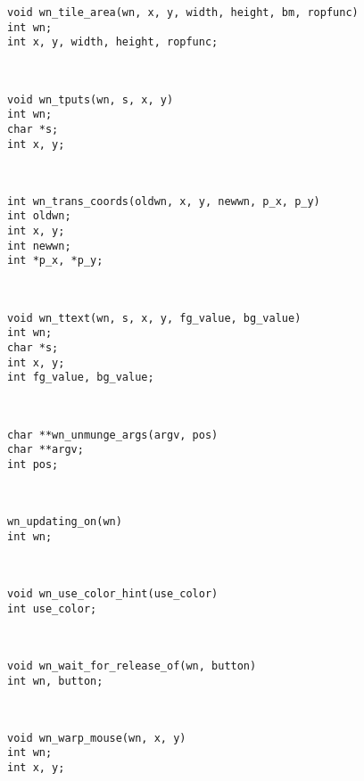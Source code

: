 \parbox[t]{5in}{\tt void wn\_tile\_area(wn, x, y, width, height, bm, ropfunc)\\int wn;\\int x, y, width, height, ropfunc;}\> \pageref{wn_tile_area}\\[0.1in]
\parbox[t]{5in}{\tt void wn\_tputs(wn, s, x, y)\\int wn;\\char *s;\\int x, y;}\> \pageref{wn_tputs}\\[0.1in]
\parbox[t]{5in}{\tt int wn\_trans\_coords(oldwn, x, y, newwn, p\_x, p\_y)\\int oldwn;\\int x, y;\\int newwn;\\int *p\_x, *p\_y;}\> \pageref{wn_trans_coords}\\[0.1in]
\parbox[t]{5in}{\tt void wn\_ttext(wn, s, x, y, fg\_value, bg\_value)\\int wn;\\char *s;\\int x, y;\\int fg\_value, bg\_value;}\> \pageref{wn_ttext}\\[0.1in]
\parbox[t]{5in}{\tt char **wn\_unmunge\_args(argv, pos)\\char **argv;\\int pos;}\> \pageref{wn_unmunge_args}\\[0.1in]
\parbox[t]{5in}{\tt wn\_updating\_on(wn)\\int wn;}\> \pageref{wn_updating_on}\\[0.1in]
\parbox[t]{5in}{\tt void wn\_use\_color\_hint(use\_color)\\int use\_color;}\> \pageref{wn_use_color_hint}\\[0.1in]
\parbox[t]{5in}{\tt void wn\_wait\_for\_release\_of(wn, button)\\int wn, button;}\> \pageref{wn_wait_for_release_of}\\[0.1in]
\parbox[t]{5in}{\tt void wn\_warp\_mouse(wn, x, y)\\int wn;\\int x, y;}\> \pageref{wn_warp_mouse}\\[0.1in]
